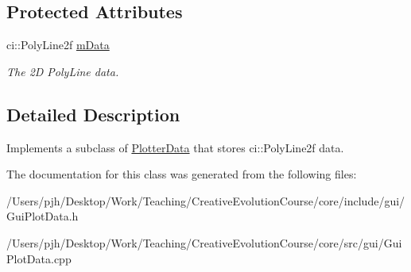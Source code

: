 \subsection*{Protected Attributes}
\begin{DoxyCompactItemize}
\item 
\hypertarget{class_poly_line_data_a7d1bd43cc0baaacf38cfa9b9d538b01a}{ci\-::\-Poly\-Line2f \hyperlink{class_poly_line_data_a7d1bd43cc0baaacf38cfa9b9d538b01a}{m\-Data}}\label{class_poly_line_data_a7d1bd43cc0baaacf38cfa9b9d538b01a}

\begin{DoxyCompactList}\small\item\em The 2\-D Poly\-Line data. \end{DoxyCompactList}\end{DoxyCompactItemize}


\subsection{Detailed Description}
Implements a subclass of \hyperlink{class_plotter_data}{Plotter\-Data} that stores ci\-::\-Poly\-Line2f data. 

The documentation for this class was generated from the following files\-:\begin{DoxyCompactItemize}
\item 
/\-Users/pjh/\-Desktop/\-Work/\-Teaching/\-Creative\-Evolution\-Course/core/include/gui/Gui\-Plot\-Data.\-h\item 
/\-Users/pjh/\-Desktop/\-Work/\-Teaching/\-Creative\-Evolution\-Course/core/src/gui/Gui\-Plot\-Data.\-cpp\end{DoxyCompactItemize}
